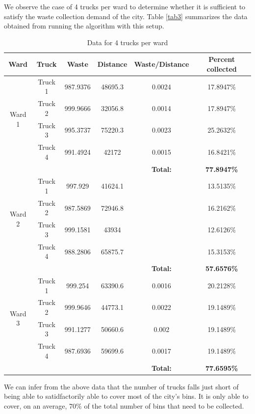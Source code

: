 \documentclass[12pt]{article}
\begin{document}
We observe the case of 4 trucks per ward to determine whether it is sufficient to satisfy the waste collection demand of the city. Table \ref{tab3} summarizes the data obtained from running the algorithm with this setup.
\begin{table}[H]
    \centering
    \caption{ Data for 4 trucks per ward} \label{tab2}
    \vspace*{0.3cm}
    \begin{tabular}{|c|c|c|c|c|c|}
        \hline Ward & Truck & Waste & Distance & Waste/Distance & Percent collected \\
        \hline \multirow{4}{*}{Ward 1} & Truck 1 & 987.9376& 48695.3 &0.0024  &17.8947\% \\
        \cline{2-6}& Truck 2 &999.9666&32056.8&0.0014&17.8947\%\\        
        \cline{2-6}& Truck 3 &995.3737&75220.3&0.0023&25.2632\%\\        
        \cline{2-6}& Truck 4 &991.4924&42172&0.0015&16.8421\%\\
        \hline & & & &\textbf{Total:} &\textbf{77.8947\%}\\
        \hline \multirow{4}{*}{Ward 2} & Truck 1 &997.929 &41624.1  &  &13.5135\% \\
        \cline{2-6}& Truck 2 &987.5869&72946.8&&16.2162\%\\        
        \cline{2-6}& Truck 3 &999.1581&43934&&12.6126\%\\        
        \cline{2-6}& Truck 4 &988.2806&65875.7&&15.3153\%\\
        \hline & & & &\textbf{Total:} &\textbf{57.6576\%}\\     
        \hline \multirow{4}{*}{Ward 3} & Truck 1 &999.254  &63390.6  &0.0016  &20.2128\% \\
        \cline{2-6}& Truck 2 &999.9646&44773.1&0.0022&19.1489\%\\        
        \cline{2-6}& Truck 3 &991.1277&50660.6&0.002&19.1489\%\\        
        \cline{2-6}& Truck 4 &987.6936&59699.6&0.0017&19.1489\%\\
        \hline & & & &\textbf{Total:} &\textbf{77.6595\%}\\
        \hline      
    \end{tabular}
\end{table}

We can infer from the above data that the number of trucks falls just short of being able to satidfactorily able to cover most of the city's bins. It is only able to cover, on an average, 70\% of the total number of bins that need to be collected.
\end{document}
